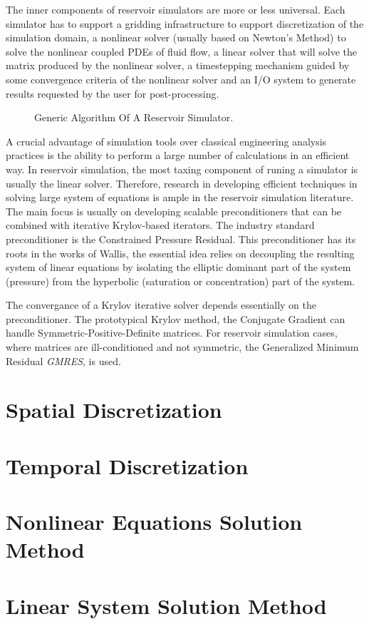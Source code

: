 The inner components of reservoir simulators are more or less universal. Each simulator has to support a 
gridding infrastructure to support discretization of the simulation domain, a nonlinear solver (usually based on Newton's Method) to 
solve the nonlinear coupled PDEs of fluid flow, a linear solver that will solve the matrix produced by the nonlinear solver, a timestepping
mechanism guided by some convergence criteria of the nonlinear solver and an I/O system to generate results requested by the user for post-processing.

\begin{figure}[htb]
\raggedright
\resizebox{15cm}{!}{}
\caption{Generic Algorithm Of A Reservoir Simulator.}\label{simulator}
\end{figure}


A crucial advantage of simulation tools over classical engineering analysis practices is the ability
to perform a large number of calculations in an efficient way. In reservoir simulation, the most taxing
component of runing a simulator is usually the linear solver. Therefore, research in developing efficient
techniques in solving large system of equations is ample in the reservoir simulation literature. The main
focus is usually on developing scalable preconditioners that can be combined with iterative Krylov-based 
iterators. The industry standard preconditioner is the Constrained Pressure Residual. This preconditioner
has its roots in the works of Wallis\supercite{Wallis_1983,Wallis_1985}, the essential idea relies on decoupling
the resulting system of linear equations by isolating the elliptic dominant part of the system (pressure) from 
the hyperbolic (saturation or concentration) part of the system. 

The convergance of a Krylov iterative solver depends essentially on the preconditioner. The prototypical Krylov method, the
Conjugate Gradient can handle Symmetric-Positive-Definite matrices. For reservoir simulation cases, where matrices are ill-conditioned and
not symmetric, the Generalized Minimum Residual \textit{GMRES}, is used\supercite{roy}. 

\section{Spatial Discretization}


\section{Temporal Discretization}

\section{Nonlinear Equations Solution Method}

\section{Linear System Solution Method}
